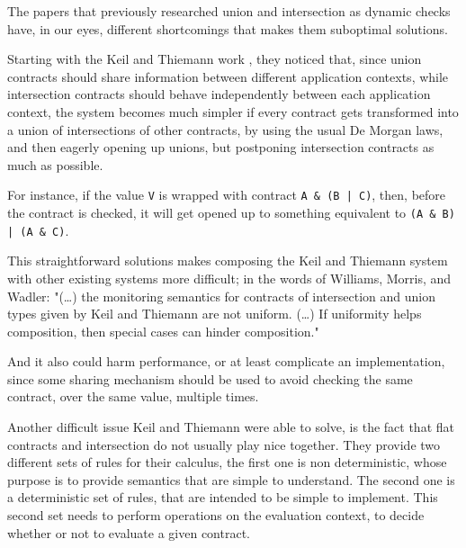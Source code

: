 \documentclass[sigplan,10pt,review,anonymous]{acmart}
\newcommand{\unsure}[2][1=]{}
\newcommand{\info}[2][1=]{}
\newcommand{\nickel}[1]{\lstinline[language=nickel]{#1}}
\begin{document}
The papers that previously researched union and intersection
as dynamic checks have, in our eyes, different shortcomings
that makes them suboptimal solutions.

Starting with the Keil and Thiemann work \cite{KeilThiemannUnionIntersection},
they noticed that, since union contracts should share information between
different application contexts, while intersection contracts should behave
independently between each application context, the system becomes much
simpler if every contract gets transformed into a union of intersections
of other contracts, by using the usual De Morgan laws,
and then eagerly opening up unions, but postponing intersection
contracts as much as possible.

For instance, if the value \nickel{V} is wrapped with contract
\nickel{A & (B | C)}, then, before the contract is checked,
it will get opened up to something equivalent to
\nickel{(A & B) | (A & C)}.

This straightforward solutions makes composing the Keil and Thiemann
system with other existing systems more difficult; in the words
of Williams, Morris, and Wadler:
"(\ldots) the monitoring semantics for contracts of intersection and union types given by Keil
and Thiemann are not uniform. (\ldots) If uniformity helps composition, then
special cases can hinder composition."\cite{RootCauseOfBlame}
\info{(Yann) Does
it also make it less efficient? If $(A \& B)$ fails because of $B$, their
development causes to recheck the contract $A$ that has been duplicated?}
And it also could harm performance, or at least complicate an implementation,
since some sharing mechanism should be used to avoid checking the same contract,
over the same value, multiple times.

Another difficult issue Keil and Thiemann were able to solve, is the
fact that flat contracts and intersection do not usually play nice
together.
They provide two different sets of rules for their calculus,
the first one is non deterministic, whose purpose is to provide
semantics that are simple to understand.
The second one is a deterministic set of rules, that are intended
to be simple to implement.
This second set needs to perform operations
on the evaluation context, to decide whether or not to evaluate
a given contract.
\unsure{Worth showing how the non deterministic version works? (See section B.1.1)}
\end{document}
